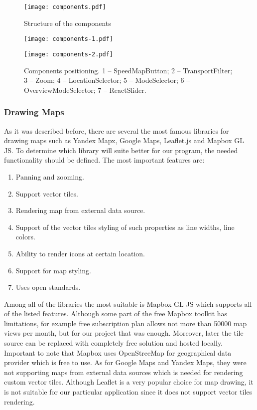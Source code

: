 \begin{figure}[ht]
  \centering
  \texttt{[image: components.pdf]}
  \caption{Structure of the components}
  \label{pic:comp-diag}
\end{figure}

\begin{figure}[ht]
  \captionsetup{justification=centering,margin=1cm}
  \centering
  \texttt{[image: components-1.pdf]}

  \par \vspace{0.5cm}

  \texttt{[image: components-2.pdf]}
  \caption{Components positioning. 1 -- SpeedMapButton; 2 -- TransportFilter; 3 -- Zoom;
  4 -- LocationSelector; 5 -- ModeSelector; 6 -- OverviewModeSelector; 7 -- ReactSlider.
  }
  \label{pic:comp-screen}
\end{figure}


\subsubsection{Drawing Maps}

As it was described before, there are several the most famous libraries for drawing maps
such as Yandex Mapx, Google Maps, Leaflet.js and Mapbox GL JS. To determine which library will
suite better for our program, the needed functionality should be defined. The most important
features are:

\begin{enumerate}
  \item Panning and zooming.
  \item Support vector tiles.
  \item Rendering map from external data source.
  \item Support of the vector tiles styling of such properties as line widths, line colors.
  \item Ability to render icons at certain location.
  \item Support for map styling.
  \item Uses open standards.
\end{enumerate}

Among all of the libraries the most suitable is Mapbox GL JS which supports all of the listed
features. Although some part of the free Mapbox toolkit has limitations, for example free
subscription plan allows not more than 50000 map views per month, but for our project that was
enough. Moreover, later the tile source can be replaced with completely free solution and hosted
locally. Important to note that Mapbox uses OpenStreeMap for geographical data provider which is
free to use. As for Google Maps and Yandex Maps, they were not supporting maps from external data
sources which is needed for rendering custom vector tiles. Although Leaflet is a very popular choice
for map drawing, it is not suitable for our particular application since it does not support vector
tiles rendering.


